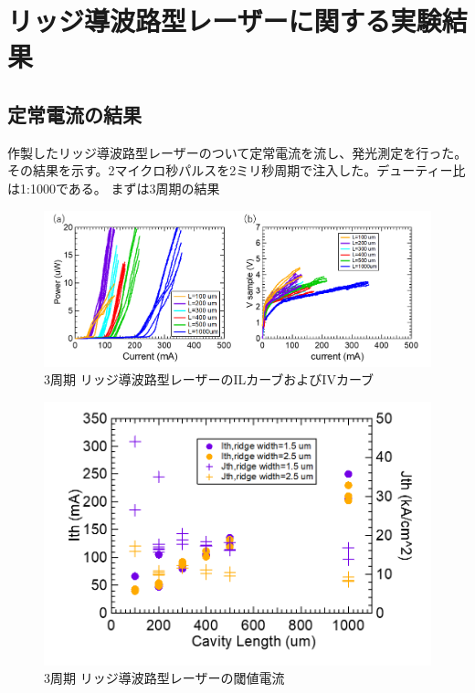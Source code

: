 {\clearpage
\section{リッジ導波路型レーザーに関する実験結果}%
\subsection{定常電流の結果}
作製したリッジ導波路型レーザーのついて定常電流を流し、発光測定を行った。その結果を示す。2マイクロ秒パルスを2ミリ秒周期で注入した。デューティー比は1:1000である。
まずは3周期の結果
\begin{figure}[h]
	\centering
	\includegraphics[width=15cm]{figure/fig_3_2_3QW_ridge_IL.png}
		\caption{3周期 リッジ導波路型レーザーのILカーブおよびIVカーブ}
		\label{fig:fig_3_2_3QW_ridge_IL}
\end{figure}
\begin{figure}[h]
	\centering
	\includegraphics[width=15cm]{figure/fig_3_2_3QW_ridge_Ith.png}
		\caption{3周期 リッジ導波路型レーザーの閾値電流}
		\label{fig:fig_3_2_3QW_ridge_Ith}
\end{figure}

}
